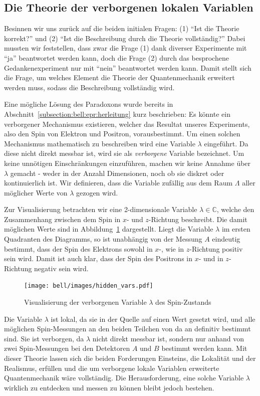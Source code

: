 \begin{refsection}
\subsection{Die Theorie der verborgenen lokalen Variablen\label{subsection:bell:epr:hiddenvars}}
Besinnen wir uns zur\"uck auf die beiden initialen Fragen: 
(1) \enquote{Ist die Theorie korrekt?} und 
(2) \enquote{Ist die Beschreibung durch die Theorie vollst\"andig?}
Dabei mussten wir feststellen, dass zwar die Frage (1) dank diverser
Experimente mit \enquote{ja} beantwortet werden kann, doch die Frage (2) 
durch das besprochene Gedankenexperiment nur mit \enquote{nein} beantwortet
werden kann. 
Damit stellt sich die Frage, um welches Element die Theorie der Quantenmechanik
erweitert werden muss, sodass die Beschreibung vollst\"andig wird.

Eine m\"ogliche L\"osung des Paradoxons wurde bereits in
Abschnitt~\ref{subsection:bell:epr:herleitung} kurz beschrieben:
Es k\"onnte ein verborgener Mechanismus existieren, welcher das Resultat unseres
Experiments, also den Spin von Elektron und Positron, vorausbestimmt.
Um einen solchen Mechanismus mathematisch zu beschreiben wird eine Variable
$\lambda$ eingef\"uhrt.
Da diese nicht direkt messbar ist, wird sie als \emph{verborgene} Variable
bezeichnet.
Um keine unn\"otigen Einschr\"ankungen einzuf\"uhren, machen wir keine Annahme
\"uber $\lambda$ gemacht - weder in der Anzahl Dimensionen, noch ob sie diskret
oder kontinuierlich ist.
Wir definieren, dass die Variable zuf\"allig aus dem Raum $\Lambda$ aller 
m\"oglicher Werte von $\lambda$ gezogen wird.

Zur Visualisierung betrachten wir eine 2-dimensionale Variable 
$\lambda\in\mathbb{C}$, welche den Zusammenhang zwischen dem Spin in $x$- 
und $z$-Richtung beschreibt.
Die damit m\"oglichen Werte sind in Abbildung~\ref{fig:bell:hidden_var}
dargestellt.
Liegt die Variable $\lambda$ im ersten Quadranten des Diagramms, so ist 
unabh\"angig von der Messung $A$ eindeutig bestimmt, dass der Spin des Elektrons
sowohl in $x$-, wie in $z$-Richtung positiv sein wird.
Damit ist auch klar, dass der Spin des Positrons in $x$- und in $z$-Richtung
negativ sein wird.

\begin{figure}
    \centering
    \texttt{[image: bell/images/hidden\_vars.pdf]}
    \caption{Visualisierung der verborgenen Variable $\lambda$ des Spin-Zustands}
    \label{fig:bell:hidden_var}
\end{figure}

Die Variable $\lambda$ ist lokal, da sie in der Quelle auf einen Wert gesetzt
wird, und alle m\"oglichen Spin-Messungen an den beiden Teilchen von da an
definitiv bestimmt sind.
Sie ist verborgen, da $\lambda$ nicht direkt messbar ist, sondern nur
anhand von zwei Spin-Messungen bei den Detektoren $A$ und $B$ bestimmt werden 
kann.
Mit dieser Theorie lassen sich die beiden Forderungen Einsteins, die Lokalit\"at
und der Realismus, erf\"ullen und die um verborgene lokale Variablen erweiterte
Quantenmechanik w\"are vollst\"andig.
Die Herausforderung, eine solche Variable $\lambda$ wirklich zu entdecken und
messen zu k\"onnen bleibt jedoch bestehen.


\end{refsection}
